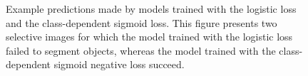 \begin{figure}[t]
\begin{minipage}{\columnwidth}
  \end{minipage}
\caption{
Example predictions made by models trained with the logistic loss and the class-dependent sigmoid loss.
This figure presents two selective images for which the model trained with the logistic loss failed to segment objects, whereas the model trained with the class-dependent sigmoid negative loss succeed.
}
\label{fig:pusegment}
\end{figure}



